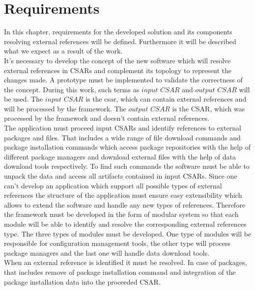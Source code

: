 
\chapter{Requirements}\label{chap:req}
In this chapter, requirements for the developed solution and its components resolving external references will be defined.
Furthermore it will be described what we expect as a result of the work.\\
It's necessary to develop the concept of the new software which will resolve external references in CSARs and complement its topology to represent the changes made.
A prototype must be implemented to validate the correctness of the concept.
During this work, such terms as $input$ $CSAR$ and $output$ $CSAR$ will be used.
The $input$ $CSAR$ is the \gls{csar}, which can contain external references and will be processed by the framework. %
The $output$ $CSAR$ is the CSAR, which was processed by the framework and doesn't contain external references. \\%
The application must proceed input CSARs and identify references to external packages and files.
That includes a wide range of file download commands and package installation commands which access package repositories with the help of different package managers and download external files with the help of data download tools respectively.
To find such commands the software must be able to unpack the data and access all artifacts contained in input CSARs.
Since one can't develop an application which support all possible types of external references the structure of the application must ensure easy extensibility which allows to extend the software and handle any new types of references.
Therefore the framework must be developed in the form of modular system so that each module will be able to identify and resolve the corresponding external references type.
The three types of modules must be developed.
One type of modules will be responsible for configuration management tools, the other type will process package managers and the last one will handle data download tools.\\
When an external reference is identified it must be resolved. 
In case of packages, that includes remove of package installation command and integration of the package installation data into the proceeded CSAR.
